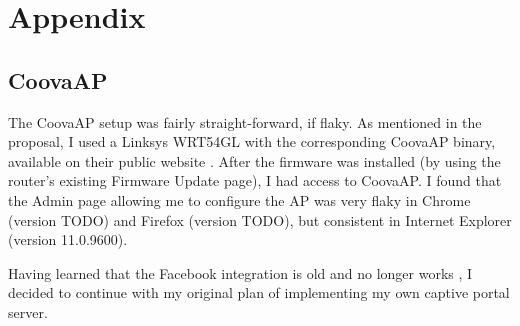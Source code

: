 \section{Appendix}
\label{section:appendix}

\subsection{CoovaAP}
The CoovaAP setup was fairly straight-forward, if flaky. As mentioned in the proposal, I used a
Linksys WRT54GL \cite{product:WRT54GL} with the corresponding CoovaAP binary, available on their
public website \cite{product:CoovaAPBin}. After the firmware was installed (by using the router's
existing Firmware Update page), I had access to CoovaAP. I found that the Admin page allowing me to
configure the AP was very flaky in Chrome (version TODO) and Firefox (version TODO), but consistent
in Internet Explorer (version 11.0.9600).

Having learned that the Facebook integration is old and no longer works
\cite{article:CoovaFacebookNoMore}, I decided to continue with my original plan of implementing my
own captive portal server.

